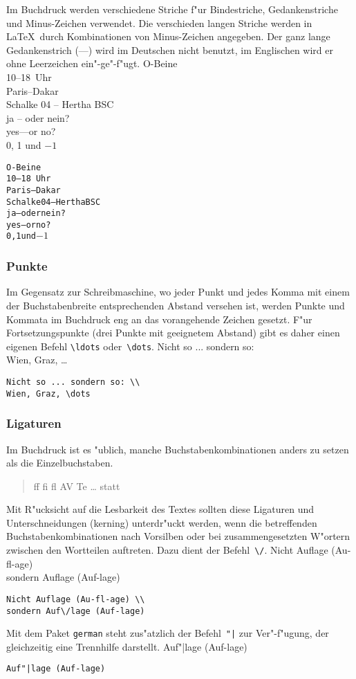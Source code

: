 Im Buchdruck werden verschiedene Striche f"ur Bindestriche,
Gedankenstriche und Minus-Zeichen verwendet.
Die verschieden langen Striche werden in \LaTeX\ durch
Kombinationen von Minus-Zeichen angegeben. Der ganz lange
Gedankenstrich (\mbox{---}) wird im Deutschen nicht benutzt, im
Englischen wird er ohne Leerzeichen ein"-ge"-f"ugt.
\exa
O-Beine \\
10--18~Uhr \\
Paris--Dakar \\
Schalke 04 -- Hertha BSC \\
ja -- oder nein? \\
yes---or no? \\
0, 1 und $-1$
\exb
\begin{alltt}
O-Beine
10--18~Uhr
Paris--Dakar
Schalke 04 -- Hertha BSC
ja -- oder nein?
yes---or no?
0, 1 und $-1$
\end{alltt}
\exc
 
\subsubsection{Punkte}
 
Im Gegensatz zur Schreibmaschine, wo jeder Punkt und jedes Komma
mit einem der Buchstabenbreite entsprechenden Abstand versehen
ist, werden Punkte und Kommata im Buchdruck eng an das
vorangehende Zeichen gesetzt. F"ur Fortsetzungspunkte (drei
Punkte mit geeignetem Abstand) gibt es daher einen eigenen Befehl
\verb|\ldots| oder~\verb|\dots|.
\exa
Nicht so ... sondern so: \\
Wien, Graz, \dots
\exb
\begin{verbatim}
Nicht so ... sondern so: \\
Wien, Graz, \dots
\end{verbatim}
\exc
 
\subsubsection{Ligaturen}
 
Im Buchdruck ist es "ublich, manche Buchstabenkombinationen
anders zu setzen als die Einzelbuchstaben.
\begin{verse}
{\large ff fi fl AV Te \dots}\quad
statt
\end{verse}
Mit R"ucksicht auf die Lesbarkeit des Textes sollten
diese  Ligaturen und Unterschneidungen (kerning) 
unterdr"uckt werden, wenn die betreffenden Buchstabenkombinationen 
nach Vorsilben oder bei zusammengesetzten W"ortern zwischen den
Wortteilen auftreten.  Dazu dient der Befehl~\verb|\/|.
\exa
Nicht Auflage (Au-fl-age) \\
sondern Auf\/lage (Auf-lage)
\exb
\begin{verbatim}
Nicht Auflage (Au-fl-age) \\
sondern Auf\/lage (Auf-lage)
\end{verbatim}
\exc
Mit dem Paket \texttt{german} steht zus"atzlich der
Befehl~\verb:"|: zur Ver"-f"ugung, der gleichzeitig eine
Trennhilfe darstellt.
\exa
Auf"|lage (Auf-lage)
\exb
\begin{verbatim}
Auf"|lage (Auf-lage)
\end{verbatim}
\exc

